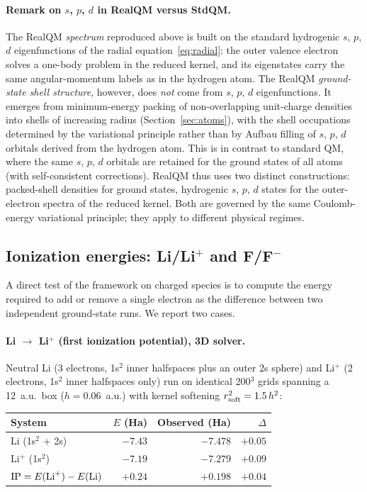 \documentclass[11pt]{article}
\begin{document}
\paragraph{Remark on $s$, $p$, $d$ in RealQM versus StdQM.}
The RealQM \emph{spectrum} reproduced above is built on the standard hydrogenic $s$, $p$, $d$ eigenfunctions of the radial equation~\eqref{eq:radial}: the outer valence electron solves a one-body problem in the reduced kernel, and its eigenstates carry the same angular-momentum labels as in the hydrogen atom. The RealQM \emph{ground-state shell structure}, however, does \emph{not} come from $s$, $p$, $d$ eigenfunctions. It emerges from minimum-energy packing of non-overlapping unit-charge densities into shells of increasing radius (Section~\ref{sec:atoms}), with the shell occupations determined by the variational principle rather than by Aufbau filling of $s$, $p$, $d$ orbitals derived from the hydrogen atom. This is in contrast to standard QM, where the same $s$, $p$, $d$ orbitals are retained for the ground states of all atoms (with self-consistent corrections). RealQM thus uses two distinct constructions: packed-shell densities for ground states, hydrogenic $s$, $p$, $d$ states for the outer-electron spectra of the reduced kernel. Both are governed by the same Coulomb-energy variational principle; they apply to different physical regimes.

\subsection{Ionization energies: Li/Li$^+$ and F/F$^-$}\label{sec:ions}

A direct test of the framework on charged species is to compute the energy required to add or remove a single electron as the difference between two independent ground-state runs. We report two cases.

\paragraph{Li $\to$ Li$^+$ (first ionization potential), 3D solver.}
Neutral Li (3 electrons, 1s$^2$ inner halfspaces plus an outer 2s sphere) and Li$^+$ (2 electrons, 1s$^2$ inner halfspaces only) run on identical 200$^3$ grids spanning a 12~a.u.\ box ($h = 0.06$~a.u.) with kernel softening $r_{\rm soft}^2 = 1.5\,h^2$:

\begin{center}
\begin{tabular}{lrrr}
\toprule
System & $E$ (Ha) & Observed (Ha) & $\Delta$ \\
\midrule
Li (1s$^2$ + 2s) & $-7.43$ & $-7.478$ & $+0.05$ \\
Li$^+$ (1s$^2$)  & $-7.19$ & $-7.279$ & $+0.09$ \\
\midrule
$\mathrm{IP} = E({\rm Li}^+) - E({\rm Li})$ & $+0.24$ & $+0.198$ & $+0.04$ \\
\bottomrule
\end{tabular}
\end{center}
\end{document}
